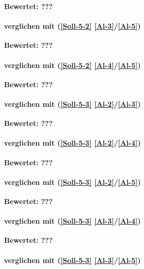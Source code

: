 \textbf{Bewertet: ???}

\paragraph*{  verglichen mit  (\ref{Soll-5-2} \ref{Al-3}/\ref{Al-5})}

\textbf{Bewertet: ???}


\paragraph*{  verglichen mit  (\ref{Soll-5-2} \ref{Al-4}/\ref{Al-5})}

\textbf{Bewertet: ???}


\paragraph*{  verglichen mit  (\ref{Soll-5-3} \ref{Al-2}/\ref{Al-3})}

\textbf{Bewertet: ???}

\paragraph*{  verglichen mit  (\ref{Soll-5-3} \ref{Al-2}/\ref{Al-4})}

\textbf{Bewertet: ???}

\paragraph*{  verglichen mit  (\ref{Soll-5-3} \ref{Al-2}/\ref{Al-5})}

\textbf{Bewertet: ???}

\paragraph*{  verglichen mit  (\ref{Soll-5-3} \ref{Al-3}/\ref{Al-4})}

\textbf{Bewertet: ???}

\paragraph*{  verglichen mit  (\ref{Soll-5-3} \ref{Al-3}/\ref{Al-5})}

